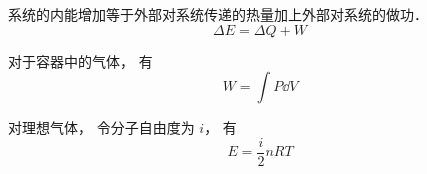 
系统的内能增加等于外部对系统传递的热量加上外部对系统的做功．
\begin{equation}
\Delta E = \Delta Q + W
\end{equation}

对于容器中的气体， 有
\begin{equation}
W = \int P \dd{V}
\end{equation}

对理想气体， 令分子自由度为 $i$， 有
\begin{equation}
E = \frac{i}{2}n RT
\end{equation}
